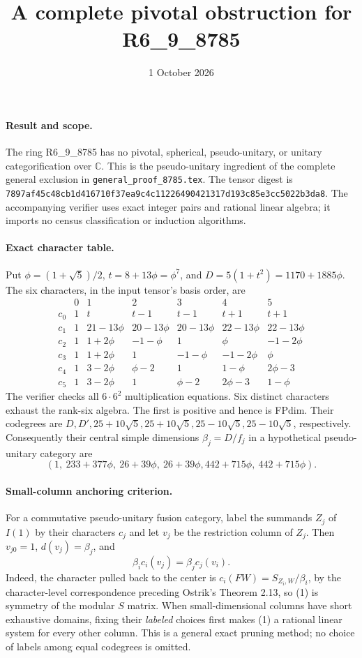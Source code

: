 \documentclass{article}
\begin{document}
\title{A complete pivotal obstruction for R6\_9\_8785}
\author{}\date{1 October 2026}\maketitle

\paragraph{Result and scope.}
The ring R6\_9\_8785 has no pivotal, spherical, pseudo-unitary, or unitary
categorification over $\mathbb C$. This is the pseudo-unitary ingredient
of the complete general exclusion in \texttt{general\_proof\_8785.tex}. The tensor digest is
\texttt{7897af45c48cb1d416710f37ea9c4c11226490421317d193c85e3cc5022b3da8}.
The accompanying verifier uses exact integer pairs and rational linear algebra;
it imports no census classification or induction algorithms.

\paragraph{Exact character table.}
Put $\phi=(1+\sqrt5)/2$, $t=8+13\phi=\phi^7$, and
$D=5(1+t^2)=1170+1885\phi$.
The six characters, in the input tensor's basis order, are
\[
\begin{array}{c|rrrrrr}
 &0&1&2&3&4&5\\\hline
 c_0&1&t&t-1&t-1&t+1&t+1\\
 c_1&1&21-13\phi&20-13\phi&20-13\phi&22-13\phi&22-13\phi\\
 c_2&1&1+2\phi&-1-\phi&1&\phi&-1-2\phi\\
 c_3&1&1+2\phi&1&-1-\phi&-1-2\phi&\phi\\
 c_4&1&3-2\phi&\phi-2&1&1-\phi&2\phi-3\\
 c_5&1&3-2\phi&1&\phi-2&2\phi-3&1-\phi
\end{array}
\]
The verifier checks all $6\cdot6^2$ multiplication equations. Six distinct
characters exhaust the rank-six algebra. The first is positive and hence is
FPdim. Their codegrees are $D,D',25+10\sqrt5,25+10\sqrt5,
25-10\sqrt5,25-10\sqrt5$, respectively. Consequently their central simple
dimensions $\beta_j=D/f_j$ in a hypothetical pseudo-unitary category are
\[
(1,\ 233+377\phi,\ 26+39\phi,\ 26+39\phi,
442+715\phi,\ 442+715\phi).
\]

\paragraph{Small-column anchoring criterion.}
For a commutative pseudo-unitary fusion category, label the summands $Z_j$ of
$I(1)$ by their characters $c_j$ and let $v_j$ be the restriction column of
$Z_j$. Then $v_{j0}=1$, $d(v_j)=\beta_j$, and
\[
 \beta_i c_i(v_j)=\beta_j c_j(v_i). \tag{1}
\]
Indeed, the character pulled back to the center is
$c_i(FW)=S_{Z_i,W}/\beta_i$, by the character-level correspondence preceding
Ostrik's Theorem 2.13, so (1) is symmetry of the modular $S$ matrix.
When small-dimensional columns have short exhaustive domains, fixing their
\emph{labeled} choices first makes (1) a rational linear system for every
other column. This is a general exact pruning method; no choice of labels
among equal codegrees is omitted.
\end{document}
